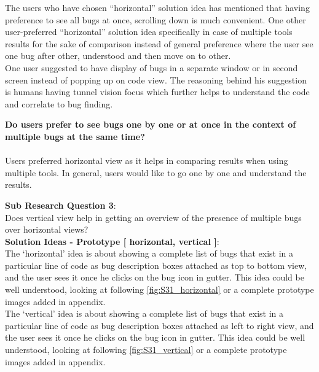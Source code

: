 The users who have chosen “horizontal” solution idea has mentioned that having preference to see all bugs at once, scrolling down is much convenient. One other user-preferred “horizontal” solution idea specifically in case of multiple tools results for the sake of comparison instead of general preference where the user see one bug after other, understood and then move on to other. \\

One user suggested to have display of bugs in a separate window or in second screen instead of popping up on code view. The reasoning behind his suggestion is humans having tunnel vision focus which further helps to understand the code and correlate to bug finding. \\


\begin{myboxi}{{\textbf{Do users prefer to see bugs one by one or at once in the context of multiple bugs at the same time?}}}
	\\ \\ Users preferred horizontal view as it helps in comparing results when using multiple tools. In general, users would like to go one by one and understand the results. \\
\end{myboxi}

\clearpage

\textbf{Sub Research Question 3}: \\

Does vertical view help in getting an overview of the presence of multiple bugs over horizontal views? \\

\textbf{Solution Ideas - Prototype [ horizontal, vertical ]}: \\

The ‘horizontal’ idea is about showing a complete list of bugs that exist in a particular line of code as bug description boxes attached as top to bottom view, and the user sees it once he clicks on the bug icon in gutter. This idea could be well understood, looking at following \autoref{fig:S31_horizontal} or a complete prototype images added in appendix. \\

The ‘vertical’ idea is about showing a complete list of bugs that exist in a particular line of code as bug description boxes attached as left to right view, and the user sees it once he clicks on the bug icon in gutter. This idea could be well understood, looking at following \autoref{fig:S31_vertical} or a complete prototype images added in appendix. \\



